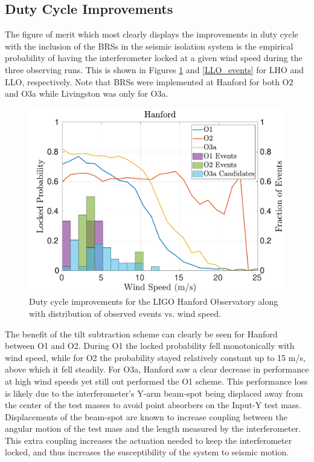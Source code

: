 \documentclass [12pt, proquest]{uwthesis}[2019]
\begin{document}
\subsection{Duty Cycle Improvements}

The figure of merit which most clearly displays the improvements in duty cycle with the inclusion of the BRSs in the seismic isolation system is the empirical probability of having the interferometer locked at a given wind speed during the three observing runs. This is shown in Figures \ref{LHO_events} and \ref{LLO_events} for LHO and LLO, respectively. Note that BRSs were implemented at Hanford for both O2 and O3a while Livingston was only for O3a.

\begin{figure}[!h]
\begin{center}
\includegraphics[width=\textwidth]{LHO_WindVsLockEvents.pdf}
\caption[Duty cycle improvements for the LIGO Hanford Observatory]{Duty cycle improvements for the LIGO Hanford Observatory along with distribution of observed events vs. wind speed. }
\label{LHO_events}
\end{center}
\end{figure}

The benefit of the tilt subtraction scheme can clearly be seen for Hanford between O1 and O2. During O1 the locked probability fell monotonically with wind speed, while for O2 the probability stayed relatively constant up to 15 m/s, above which it fell steadily. For O3a, Hanford saw a clear decrease in performance at high wind speeds yet still out performed the O1 scheme. This performance loss is likely due to the interferometer's Y-arm beam-spot being displaced away from the center of the test masses to avoid point absorbers on the Input-Y test mass. Displacements of the beam-spot are known to increase coupling between the angular motion of the test mass and the length measured by the interferometer. This extra coupling increases the actuation needed to keep the interferometer locked, and thus increases the susceptibility of the system to seismic motion. 
\end{document}
